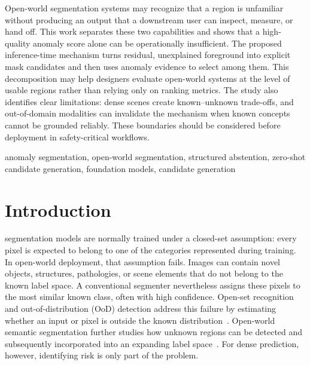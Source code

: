 \documentclass[journal]{IEEEtai}
\begin{document}
\begin{IEEEImpStatement}
Open-world segmentation systems may recognize that a region is unfamiliar without producing an output that a downstream user can inspect, measure, or hand off. This work separates these two capabilities and shows that a high-quality anomaly score alone can be operationally insufficient. The proposed inference-time mechanism turns residual, unexplained foreground into explicit mask candidates and then uses anomaly evidence to select among them. This decomposition may help designers evaluate open-world systems at the level of usable regions rather than relying only on ranking metrics. The study also identifies clear limitations: dense scenes create known--unknown trade-offs, and out-of-domain modalities can invalidate the mechanism when known concepts cannot be grounded reliably. These boundaries should be considered before deployment in safety-critical workflows.
\end{IEEEImpStatement}

\begin{IEEEkeywords}
anomaly segmentation, open-world segmentation, structured abstention, zero-shot candidate generation, foundation models, candidate generation
\end{IEEEkeywords}

\section{Introduction}
\label{sec:intro}

 segmentation models are normally trained under a closed-set assumption: every pixel is expected to belong to one of the categories represented during training. In open-world deployment, that assumption fails. Images can contain novel objects, structures, pathologies, or scene elements that do not belong to the known label space. A conventional segmenter nevertheless assigns these pixels to the most similar known class, often with high confidence. Open-set recognition and out-of-distribution (OoD) detection address this failure by estimating whether an input or pixel is outside the known distribution~\cite{hendrycks2017baselinedetecting,liu2020energyout,yang2024generalizedout}. Open-world semantic segmentation further studies how unknown regions can be detected and subsequently incorporated into an expanding label space~\cite{cen2021deepmetric}. For dense prediction, however, identifying risk is only part of the problem.
\end{document}
